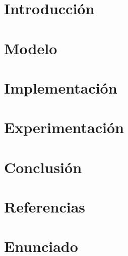 \documentclass[a4paper]{article}
\begin{document}
\tableofcontents

\newpage
\section{Introducción}


\newpage
\section{Modelo}


\newpage
\section{Implementación}\label{Implementacion}


\newpage
\section{Experimentación}


\newpage
\section{Conclusión}
%

\newpage
%
\section{Referencias}
%

\newpage
\section{Enunciado}
%

\newpage
\appendix
%
\end{document}
